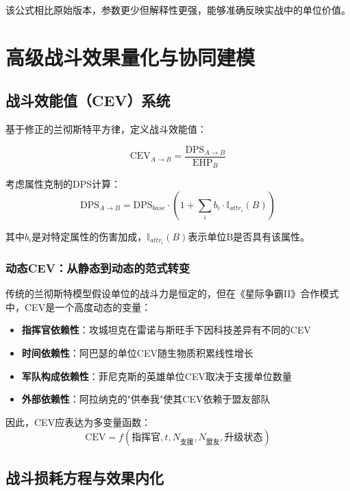 \documentclass[a4paper,12pt]{article}
\begin{document}
该公式相比原始版本，参数更少但解释性更强，能够准确反映实战中的单位价值。

\section{高级战斗效果量化与协同建模}

\subsection{战斗效能值（CEV）系统}
基于修正的兰彻斯特平方律，定义战斗效能值：

\begin{equation}
\text{CEV}_{A \rightarrow B} = \frac{\text{DPS}_{A \rightarrow B}}{\text{EHP}_B}
\end{equation}

考虑属性克制的DPS计算：
\begin{equation}
\text{DPS}_{A \rightarrow B} = \text{DPS}_{base} \cdot (1 + \sum_i b_i \cdot \mathbb{I}_{attr_i}(B))
\end{equation}

其中$b_i$是对特定属性的伤害加成，$\mathbb{I}_{attr_i}(B)$表示单位B是否具有该属性。

\subsubsection{动态CEV：从静态到动态的范式转变}
传统的兰彻斯特模型假设单位的战斗力是恒定的，但在《星际争霸II》合作模式中，CEV是一个高度动态的变量：

\begin{itemize}
\item \textbf{指挥官依赖性}：攻城坦克在雷诺与斯旺手下因科技差异有不同的CEV
\item \textbf{时间依赖性}：阿巴瑟的单位CEV随生物质积累线性增长
\item \textbf{军队构成依赖性}：菲尼克斯的英雄单位CEV取决于支援单位数量
\item \textbf{外部依赖性}：阿拉纳克的"供奉我"使其CEV依赖于盟友部队
\end{itemize}

因此，CEV应表达为多变量函数：
\begin{equation}
\text{CEV} = f(\text{指挥官}, t, N_{支援}, N_{盟友}, \text{升级状态})
\end{equation}

\subsection{战斗损耗方程与效果内化}
\end{document}
